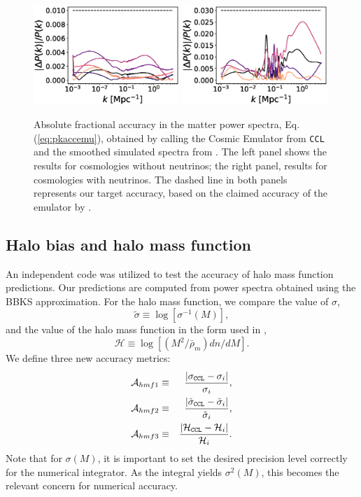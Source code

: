 \documentclass[\docopts]{\docclass}
\newcommand{\ccl}{{\tt CCL}\xspace}
\begin{document}
\begin{figure}
  \centering
  \includegraphics[width=0.49\textwidth]{poweremu}
  \includegraphics[width=0.49\textwidth]{poweremu_nu}
  \caption{Absolute fractional accuracy in the matter power spectra, Eq. (\ref{eq:pkaccemu}), obtained by calling the Cosmic Emulator from \ccl and the smoothed simulated spectra from \citet{Lawrence17}. The left panel shows the results for cosmologies without neutrinos; the right panel, results for cosmologies with neutrinos. The dashed line in both panels represents our target accuracy, based on the claimed accuracy of the emulator by \citet{Lawrence17}.}
  \label{fig:emuacc}
\end{figure}

\subsection{Halo bias and halo mass function}

An independent code was utilized to test the accuracy of halo mass function predictions. Our predictions are computed from power spectra obtained using the BBKS approximation. For the halo mass function, we compare the value of $\sigma$,
\begin{equation}
  \tilde\sigma\equiv\log[\sigma^{-1}(M)],\label{eq:tildesig}
\end{equation}
and the value of the halo mass function in the form used in \citet{Tinker2008},
\begin{equation}
  \mathcal{H}\equiv \log[(M^2/\bar{\rho}_m)dn/dM].
  \label{eq:newhmf}
\end{equation}
We define three new accuracy metrics:
\begin{eqnarray}
  \mathcal{A}_{hmf1}&\equiv&\frac{|\sigma_{\tt CCL}-\sigma_i|}{\sigma_i},\\
  \mathcal{A}_{hmf2}&\equiv&\frac{|\tilde\sigma_{\tt CCL}-\tilde\sigma_i|}{\tilde\sigma_i},\\
  \mathcal{A}_{hmf3}&\equiv&\frac{|\mathcal{H}_{\tt CCL}-\mathcal{H}_i|}{\mathcal{H}_i}.
\end{eqnarray}
Note that for $\sigma(M)$, it is important to set the desired precision level correctly for the numerical integrator. As the integral yields $\sigma^2(M)$, this becomes the relevant concern for numerical accuracy. 
\end{document}
